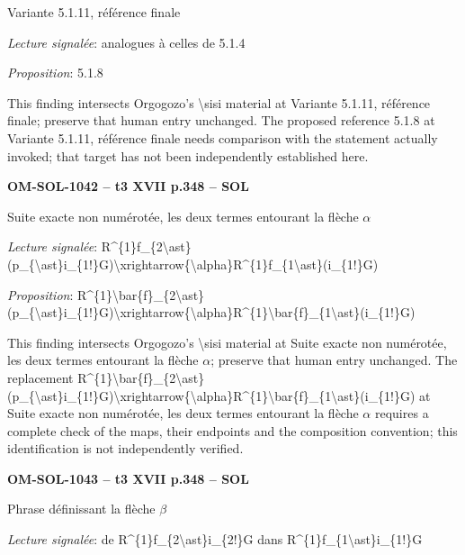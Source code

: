 Variante 5.1.11, référence finale\par
\emph{Lecture signalée}: analogues à celles de 5.1.4\par
\emph{Proposition}: 5.1.8\par
This finding intersects Orgogozo's \textbackslash{}sisi material at Variante 5.1.11, référence finale; preserve that human entry unchanged. The proposed reference 5.1.8 at Variante 5.1.11, référence finale needs comparison with the statement actually invoked; that target has not been independently established here.\par
\par\noindent\textbf{OM-SOL-1042 -- t3 XVII p.348 -- SOL}\par
Suite exacte non numérotée, les deux termes entourant la flèche \ensuremath{\alpha}\par
\emph{Lecture signalée}: R\textasciicircum{}\{1\}f\_\{2\textbackslash{}ast\}(p\_\{\textbackslash{}ast\}i\_\{1!\}G)\textbackslash{}xrightarrow\{\textbackslash{}alpha\}R\textasciicircum{}\{1\}f\_\{1\textbackslash{}ast\}(i\_\{1!\}G)\par
\emph{Proposition}: R\textasciicircum{}\{1\}\textbackslash{}bar\{f\}\_\{2\textbackslash{}ast\}(p\_\{\textbackslash{}ast\}i\_\{1!\}G)\textbackslash{}xrightarrow\{\textbackslash{}alpha\}R\textasciicircum{}\{1\}\textbackslash{}bar\{f\}\_\{1\textbackslash{}ast\}(i\_\{1!\}G)\par
This finding intersects Orgogozo's \textbackslash{}sisi material at Suite exacte non numérotée, les deux termes entourant la flèche \ensuremath{\alpha}; preserve that human entry unchanged. The replacement R\textasciicircum{}\{1\}\textbackslash{}bar\{f\}\_\{2\textbackslash{}ast\}(p\_\{\textbackslash{}ast\}i\_\{1!\}G)\textbackslash{}xrightarrow\{\textbackslash{}alpha\}R\textasciicircum{}\{1\}\textbackslash{}bar\{f\}\_\{1\textbackslash{}ast\}(i\_\{1!\}G) at Suite exacte non numérotée, les deux termes entourant la flèche \ensuremath{\alpha} requires a complete check of the maps, their endpoints and the composition convention; this identification is not independently verified.\par
\par\noindent\textbf{OM-SOL-1043 -- t3 XVII p.348 -- SOL}\par
Phrase définissant la flèche \ensuremath{\beta}\par
\emph{Lecture signalée}: de R\textasciicircum{}\{1\}f\_\{2\textbackslash{}ast\}i\_\{2!\}G dans R\textasciicircum{}\{1\}f\_\{1\textbackslash{}ast\}i\_\{1!\}G\par
